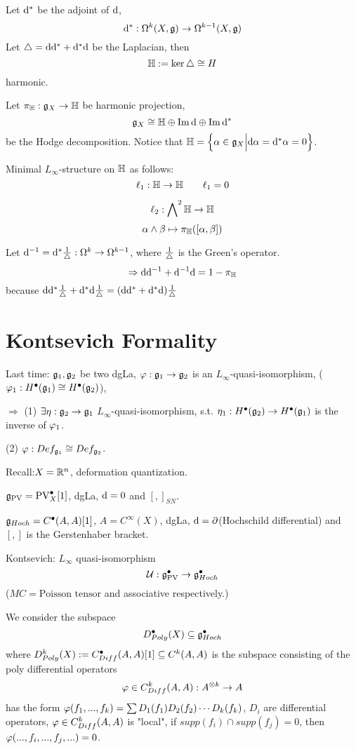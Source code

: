 Let $\mathrm{d}^*$ be the adjoint of $\mathrm{d}$,
$$\mathrm{d}^*:\Omega^k(X,\mathfrak{g})\to\Omega^{k-1}(X,\mathfrak{g})$$
Let $\triangle=\mathrm{d}\mathrm{d}^*+\mathrm{d}^*\mathrm{d}$ be the Laplacian, then
$$\mathbb{H}:=\ker\triangle\cong H$$
harmonic.

Let $\pi_{\mathbb{H}}:\mathfrak{g}_X\to\mathbb{H}$ be harmonic projection,
$$\mathfrak{g}_X\cong\mathbb{H}\oplus\operatorname{Im}\mathrm{d}\oplus\operatorname{Im}\mathrm{d}^*$$
be the Hodge decomposition.
Notice that $\mathbb{H}=\Big\{ \alpha\in\mathfrak{g}_X \Big| \mathrm{d}\alpha=\mathrm{d}^*\alpha=0 \Big\}$.

Minimal $L_\infty$-structure on $\mathbb{H}$ as follows:
$$\ell_1:\mathbb{H}\to\mathbb{H} \qquad \ell_1=0$$

$$\ell_2:\bigwedge\nolimits^{2}\mathbb{H}\to\mathbb{H}$$
$$\alpha\wedge\beta\mapsto \pi_{\mathbb{H}}([\alpha,\beta])$$

Let $\mathrm{d}^{-1}=\mathrm{d}^*\frac{1}{\triangle}:\Omega^k\to\Omega^{k-1}$,
where $\frac{1}{\triangle}$ is the Green's operator.
$$\Rightarrow
\mathrm{d}\mathrm{d}^{-1}+\mathrm{d}^{-1}\mathrm{d}=1-\pi_{\mathbb{H}}$$
because
$\mathrm{d}\mathrm{d}^*\frac{1}{\triangle}+\mathrm{d}^*\mathrm{d}\frac{1}{\triangle}=
(\mathrm{d}\mathrm{d}^*+\mathrm{d}^*\mathrm{d})\frac{1}{\triangle}$


\section{Kontsevich Formality}

Last time: $\mathfrak{g}_1,\mathfrak{g}_2$ be two dgLa,
$\varphi:\mathfrak{g}_1\to\mathfrak{g}_2$ is an $L_\infty$-quasi-isomorphism,
($\varphi_1:H^{\bullet}(\mathfrak{g}_1)\cong H^{\bullet}(\mathfrak{g}_2)$),

$\Rightarrow$ (1) $\exists \eta:\mathfrak{g}_2\to\mathfrak{g}_1$ $L_\infty$-quasi-isomorphism,
s.t. $\eta_1:H^{\bullet}(\mathfrak{g}_2)\to H^{\bullet}(\mathfrak{g}_1)$ is the inverse of $\varphi_1$.

(2) $\varphi:Def_{\mathfrak{g}_1}\cong Def_{\mathfrak{g}_2}$.

Recall:$X=\mathbb{R}^n$, deformation quantization.

$\mathfrak{g}_{\operatorname{PV}}=\operatorname{PV}_X^{\bullet}[1]$, dgLa, $\mathrm{d}=0$ and $[,]_{SN}$.

$\mathfrak{g}_{Hoch}=C^{\bullet}(A,A)[1]$, $A=C^\infty(X)$, dgLa,
$\mathrm{d}=\partial$(Hochschild differential) and
$[,]$ is the Gerstenhaber bracket.

Kontsevich: $L_\infty$ quasi-isomorphism
$$\mathcal{U}:\mathfrak{g}_{\operatorname{PV}}^{\bullet}\to\mathfrak{g}_{Hoch}^{\bullet}$$
($MC=\text{Poisson tensor}$ and associative respectively.)

We consider the subspace
$$D_{Poly}^{\bullet}(X)\subseteq \mathfrak{g}_{Hoch}^{\bullet}$$
where $D_{Poly}^k(X):=C_{Diff}^{\bullet}(A,A)[1]\subseteq C^k(A,A)$
is the subspace consisting of the poly differential operators
$$\varphi\in C_{Diff}^k(A,A):A^{\otimes k}\to A$$
has the form $\varphi(f_1,...,f_k)=\sum D_1(f_1)D_2(f_2)\cdots D_k(f_k)$,
$D_i$ are differential operators,
$\varphi\in C_{Diff}^k(A,A)$ is "local",
if $supp(f_i)\cap supp(f_j)=0$, then
$\varphi(...,f_i,...,f_j,...)=0$.

